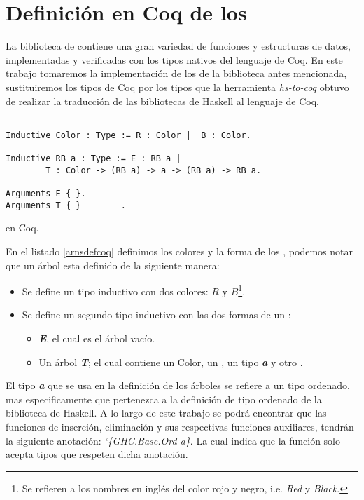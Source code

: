 \section{Definici\'on en Coq de los {\arns}}

La biblioteca de {\coq} contiene una gran variedad de funciones y estructuras de datos, 
implementadas y verificadas con los tipos nativos del lenguaje de Coq. En este trabajo
tomaremos la implementaci\'on de los {\arns} de la biblioteca antes mencionada, 
sustituiremos los tipos de Coq por los tipos que la herramienta \textit{hs-to-coq} obtuvo
de realizar la traducci\'on de las bibliotecas de Haskell al lenguaje de Coq.

\begin{listing}[!ht]
\centering
\captionsetup{justification=centering}
\begin{verbatim}

Inductive Color : Type := R : Color |  B : Color.

Inductive RB a : Type := E : RB a |  
        T : Color -> (RB a) -> a -> (RB a) -> RB a.

Arguments E {_}.
Arguments T {_} _ _ _ _.
\end{verbatim}
\caption{{\Arns} en Coq.}
\label{arnsdefcoq}
\end{listing}

En el listado \ref{arnsdefcoq} definimos los colores y la forma de los {\arns}, podemos notar que un \'arbol esta definido de la siguiente manera:
\begin{itemize}
    \item Se define un tipo inductivo con dos colores: $R$ y $B$\footnote{Se refieren a los nombres en ingl\'es del color rojo y negro, i.e. \textit{Red} y \textit{Black}.}.
    \item Se define un segundo tipo inductivo con las dos formas de un {\arn}:
    \begin{itemize}
        \item \textit{\textbf{E}}, el cual es el \'arbol vacío.
        \item Un \'arbol \textit{\textbf{T}}; el cual contiene un Color, un {\arn}, un tipo \textit{\textbf{a}} y otro {\arn}.
    \end{itemize}
\end{itemize}

El tipo \textit{\textbf{a}} que se usa en la definici\'on de los \'arboles se refiere a 
un tipo ordenado, mas especificamente que pertenezca a la definici\'on de tipo ordenado 
de la biblioteca de Haskell\cite{orderings}. A lo largo de este trabajo se podr\'a 
encontrar que las funciones de inserci\'on, eliminaci\'on y sus respectivas funciones 
auxiliares, tendr\'an la siguiente anotaci\'on: \textit{`\{GHC.Base.Ord a\}}. La cual 
indica que la funci\'on solo acepta tipos que respeten dicha anotaci\'on.

